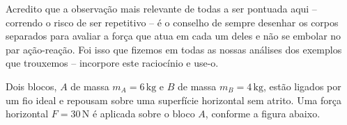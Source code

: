 
Acredito que a observação mais relevante de todas a ser pontuada aqui -- correndo o risco de ser repetitivo -- é o conselho de sempre desenhar os corpos separados para avaliar a força que atua em cada um deles e não se embolar no par ação-reação. Foi isso que fizemos em todas as nossas análises dos exemplos que trouxemos -- incorpore este raciocínio e use-o.


\vspace{0.3cm}


\begin{exemplo}[Nível I]\label{exemplo_newton_terceiralei01}

Dois blocos, $A$ de massa $m_A = 6\,\text{kg}$ e $B$ de massa $m_B = 4\,\text{kg}$,
estão ligados por um fio ideal e repousam sobre uma superfície horizontal sem atrito.
Uma força horizontal $F = 30\,\text{N}$ é aplicada sobre o bloco $A$, conforme a
figura abaixo. 


\begin{center}
\end{center}







\end{exemplo}
